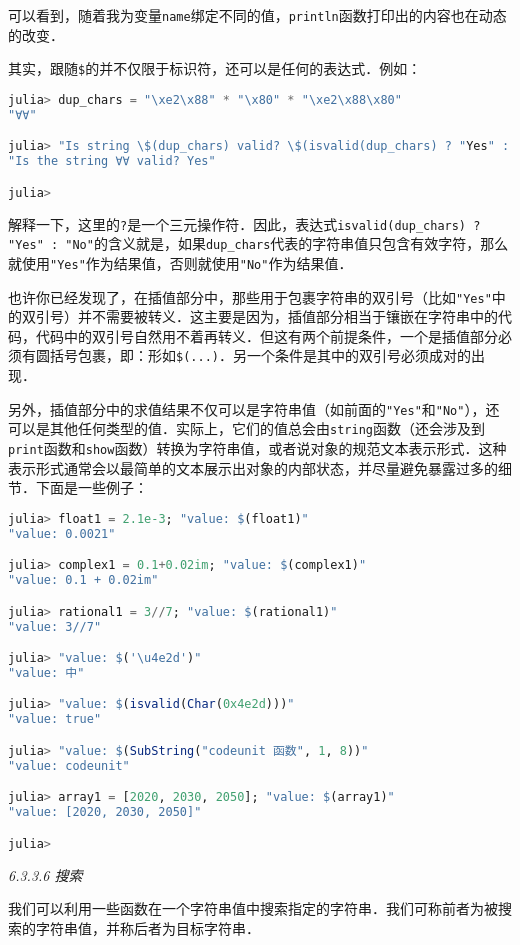 可以看到，随着我为变量\verb|name|绑定不同的值，\verb|println|函数打印出的内容也在动态的改变．

其实，跟随\verb|$|的并不仅限于标识符，还可以是任何的表达式．例如：
\begin{lstlisting}[language=julia]
julia> dup_chars = "\xe2\x88" * "\x80" * "\xe2\x88\x80"
"∀∀"

julia> "Is string \$(dup_chars) valid? \$(isvalid(dup_chars) ? "Yes" : "No")"
"Is the string ∀∀ valid? Yes"

julia> 
\end{lstlisting}

解释一下，这里的\verb|?|是一个三元操作符．因此，表达式\verb|isvalid(dup_chars) ? "Yes" : "No"|的含义就是，如果\verb|dup_chars|代表的字符串值只包含有效字符，那么就使用\verb|"Yes"|作为结果值，否则就使用\verb|"No"|作为结果值．

也许你已经发现了，在插值部分中，那些用于包裹字符串的双引号（比如\verb|"Yes"|中的双引号）并不需要被转义．这主要是因为，插值部分相当于镶嵌在字符串中的代码，代码中的双引号自然用不着再转义．但这有两个前提条件，一个是插值部分必须有圆括号包裹，即：形如\verb|$(...)|．另一个条件是其中的双引号必须成对的出现．

另外，插值部分中的求值结果不仅可以是字符串值（如前面的\verb|"Yes"|和\verb|"No"|），还可以是其他任何类型的值．实际上，它们的值总会由\verb|string|函数（还会涉及到\verb|print|函数和\verb|show|函数）转换为字符串值，或者说对象的规范文本表示形式．这种表示形式通常会以最简单的文本展示出对象的内部状态，并尽量避免暴露过多的细节．下面是一些例子：
\begin{lstlisting}[language=julia]
julia> float1 = 2.1e-3; "value: $(float1)"
"value: 0.0021"

julia> complex1 = 0.1+0.02im; "value: $(complex1)"
"value: 0.1 + 0.02im"

julia> rational1 = 3//7; "value: $(rational1)"
"value: 3//7"

julia> "value: $('\u4e2d')"
"value: 中"

julia> "value: $(isvalid(Char(0x4e2d)))"
"value: true"

julia> "value: $(SubString("codeunit 函数", 1, 8))"
"value: codeunit"

julia> array1 = [2020, 2030, 2050]; "value: $(array1)"
"value: [2020, 2030, 2050]"

julia> 
\end{lstlisting}

\textsl{6.3.3.6 搜索}

我们可以利用一些函数在一个字符串值中搜索指定的字符串．我们可称前者为被搜索的字符串值，并称后者为目标字符串．

